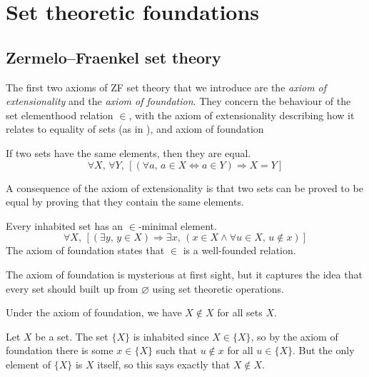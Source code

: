 \section{Set theoretic foundations}

\todo{}

\subsection*{Zermelo--Fraenkel set theory}

\todo{}

The first two axioms of ZF set theory that we introduce are the \textit{axiom of extensionality} and the \textit{axiom of foundation}. They concern the behaviour of the set elementhood relation $\in$, with the axiom of extensionality describing how it relates to equality of sets (as in ), and axiom of foundation 

\begin{axiom}
\label{axZFCExtensionality}
If two sets have the same elements, then they are equal.
\[ \forall X,\, \forall Y,\, [(\forall a,\, a \in X \Leftrightarrow a \in Y) \Rightarrow X=Y] \]
\end{axiom}

A consequence of the axiom of extensionality is that two sets can be proved to be equal by proving that they contain the same elements.

\begin{axiom}
Every inhabited set has an $\in$-minimal element.
\[ \forall X,\, [(\exists y,\, y \in X) \Rightarrow \exists x,\, (x \in X \wedge \forall u \in X,\, u \not \in x)] \]
The axiom of foundation states that $\in$ is a well-founded relation.
\end{axiom}

The axiom of foundation is mysterious at first sight, but it captures the idea that every set should built up from $\varnothing$ using set theoretic operations.

\begin{lemma}
Under the axiom of foundation, we have $X \not \in X$ for all sets $X$.
\end{lemma}

\begin{cproof}
Let $X$ be a set. The set $\{ X \}$ is inhabited since $X \in \{ X \}$, so by the axiom of foundation there is some $x \in \{ X \}$ such that $u \not\in x$ for all $u \in \{ X \}$. But the only element of $\{ X \}$ is $X$ itself, so this says exactly that $X \not\in X$.
\end{cproof}

